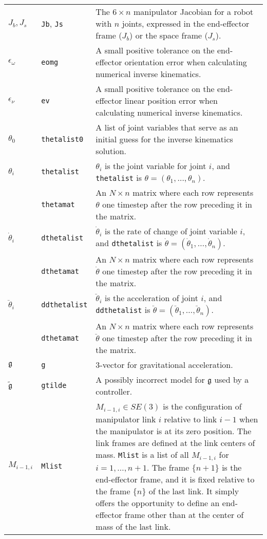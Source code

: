 \documentclass[11pt]{article}
\begin{document}
\begin{tabularx}{\linewidth}{llp{4.5in}}
$J_b, J_s$ & {\tt Jb}, {\tt Js} & The $6 \times n$ manipulator Jacobian for a robot with $n$ joints, expressed in the end-effector frame ($J_b$) or the space frame ($J_s$). \\
${\epsilon}_{\omega}$ & {\tt eomg} & A small positive tolerance on the end-effector orientation error when calculating numerical inverse kinematics. \\
${\epsilon}_{\nu}$ & {\tt ev} & A small positive tolerance on the end-effector linear position error when calculating numerical inverse kinematics. \\
$\theta_0$ & {\tt thetalist0} & A list of joint variables that serve as an initial guess for the inverse kinematics solution.\\
$\theta_i$ & {\tt thetalist} & $\theta_i$ is the joint variable for joint $i$, and {\tt thetalist} is $\theta = (\theta_1, \ldots, \theta_n)$.\\
& {\tt thetamat} & An $N \times n$ matrix where each row represents $\theta$ one timestep after the row preceding it in the matrix. \\
$\dot{\theta}_i$ & {\tt dthetalist} & $\dot{\theta}_i$ is the rate of change of joint variable $i$, and {\tt dthetalist} is $\dot{\theta} = (\dot{\theta}_1, \ldots, \dot{\theta}_n)$. \\
& {\tt dthetamat} & An $N \times n$ matrix where each row represents $\dot{\theta}$ one timestep after the row preceding it in the matrix. \\
$\ddot{\theta}_i$ & {\tt ddthetalist} & $\ddot{\theta}_i$ is the acceleration of joint $i$, and {\tt ddthetalist} is $\ddot{\theta} = (\ddot{\theta}_1, \ldots, \ddot{\theta}_n)$. \\
& {\tt dthetamat} & An $N \times n$ matrix where each row represents $\ddot{\theta}$ one timestep after the row preceding it in the matrix. \\
$\mathfrak{g}$ & {\tt g} & $3$-vector for gravitational acceleration. \\
$\tilde{\mathfrak{g}}$ & {\tt gtilde} & A possibly incorrect model for $\mathfrak{g}$ used by a controller. \\
$M_{i-1,i} $ & {\tt Mlist} & $M_{i-1,i} \in SE(3)$ is the configuration of manipulator link $i$ relative to link $i-1$ when the manipulator is at its zero position.  The link frames are defined at the link centers of mass.  {\tt Mlist} is a list of all $M_{i-1,i}$ for $i = 1, \ldots, n+1$.  The frame $\{n+1\}$ is the end-effector frame, and it is fixed relative to the frame $\{n\}$ of the last link.  It simply offers the opportunity to define an end-effector frame other than at the center of mass of the last link. \\

\end{tabularx}
\end{document}
